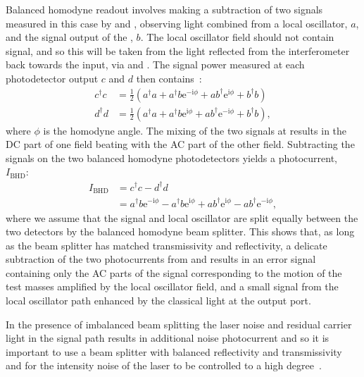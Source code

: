 Balanced homodyne readout involves making a subtraction of two signals measured in this case by \HDA{} and \HDB{}, observing light combined from a local oscillator, $a$, and the signal output of the \SSM{}, $b$. The local oscillator field should not contain signal, and so this will be taken from the light reflected from the interferometer back towards the input, via \MTWELVE{} and \MTHIRTEEN{}. The signal power measured at each photodetector output $c$ and $d$ then contains~\cite{Steinlechner2015}:
\begin{equation}
  \begin{split}
    c^{\dag} c &= \frac{1}{2} \left( a^{\dag} a + a^{\dag} b \text{e}^{-\text{i} \phi} + a b^{\dag} \text{e}^{\text{i} \phi} + b^{\dag} b \right) \\
    d^{\dag} d &= \frac{1}{2} \left( a^{\dag} a + a^{\dag} b \text{e}^{\text{i} \phi} + a b^{\dag} \text{e}^{-\text{i} \phi} + b^{\dag} b \right),
  \end{split}
\end{equation}
where $\phi$ is the homodyne angle. The mixing of the two signals at \MSIXTEEN{} results in the \gls{DC} part of one field beating with the \gls{AC} part of the other field. Subtracting the signals on the two balanced homodyne photodetectors yields a photocurrent, $I_{\text{BHD}}$:
\begin{equation}
  \begin{split}
    I_{\text{BHD}} &= c^{\dag} c - d^{\dag} d \\
                   &= a^{\dag} b \text{e}^{-\text{i} \phi} - a^{\dag} b \text{e}^{\text{i} \phi} + a b^{\dag} \text{e}^{\text{i} \phi} - a b^{\dag} \text{e}^{-\text{i} \phi},
  \end{split}
\end{equation}
where we assume that the signal and local oscillator are split equally between the two detectors by the balanced homodyne beam splitter. This shows that, as long as the beam splitter has matched transmissivity and reflectivity, a delicate subtraction of the two photocurrents from \HDA{} and \HDB{} results in an error signal containing only the \gls{AC} parts of the signal corresponding to the motion of the test masses amplified by the local oscillator field, and a small signal from the local oscillator path enhanced by the classical light at the output port.

In the presence of imbalanced beam splitting the laser noise and residual carrier light in the signal path results in additional noise photocurrent and so it is important to use a beam splitter with balanced reflectivity and transmissivity and for the intensity noise of the laser to be controlled to a high degree~\cite{Steinlechner2015}.

